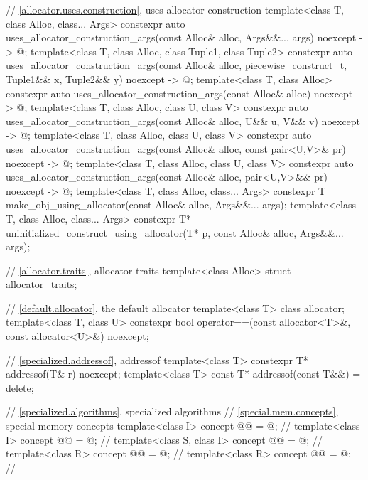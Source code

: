 \begin{codeblock}
{  // \ref{allocator.uses.construction}, uses-allocator construction
  template<class T, class Alloc, class... Args>
    constexpr auto uses_allocator_construction_args(const Alloc& alloc,
                                                    Args&&... args) noexcept -> @\seebelow@;
  template<class T, class Alloc, class Tuple1, class Tuple2>
    constexpr auto uses_allocator_construction_args(const Alloc& alloc, piecewise_construct_t,
                                                    Tuple1&& x, Tuple2&& y)
                                                    noexcept ->  @\seebelow@;
  template<class T, class Alloc>
    constexpr auto uses_allocator_construction_args(const Alloc& alloc) noexcept -> @\seebelow@;
  template<class T, class Alloc, class U, class V>
    constexpr auto uses_allocator_construction_args(const Alloc& alloc,
                                                    U&& u, V&& v) noexcept -> @\seebelow@;
  template<class T, class Alloc, class U, class V>
    constexpr auto uses_allocator_construction_args(const Alloc& alloc,
                                                    const pair<U,V>& pr) noexcept -> @\seebelow@;
  template<class T, class Alloc, class U, class V>
    constexpr auto uses_allocator_construction_args(const Alloc& alloc,
                                                    pair<U,V>&& pr) noexcept -> @\seebelow@;
  template<class T, class Alloc, class... Args>
    constexpr T make_obj_using_allocator(const Alloc& alloc, Args&&... args);
  template<class T, class Alloc, class... Args>
    constexpr T* uninitialized_construct_using_allocator(T* p, const Alloc& alloc,
                                                         Args&&... args);

  // \ref{allocator.traits}, allocator traits
  template<class Alloc> struct allocator_traits;

  // \ref{default.allocator}, the default allocator
  template<class T> class allocator;
  template<class T, class U>
    constexpr bool operator==(const allocator<T>&, const allocator<U>&) noexcept;

  // \ref{specialized.addressof}, addressof
  template<class T>
    constexpr T* addressof(T& r) noexcept;
  template<class T>
    const T* addressof(const T&&) = delete;

  // \ref{specialized.algorithms}, specialized algorithms
  // \ref{special.mem.concepts}, special memory concepts
  template<class I>
    concept @@ = @\seebelow@;    // \expos
  template<class I>
    concept @@ = @\seebelow@;  // \expos
  template<class S, class I>
    concept @@ = @\seebelow@;      // \expos
  template<class R>
    concept @@ = @\seebelow@;       // \expos
  template<class R>
    concept @@ = @\seebelow@;     // \expos

}
\end{codeblock}
